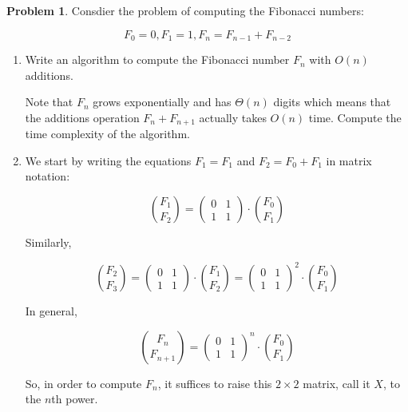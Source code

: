 \documentclass{article}
\theoremstyle{definition}
\newtheorem{problem}{Problem}
\def\fline{\rule{0.75\linewidth}{0.5pt}}
\newcommand{\finishline}{\begin{center}\fline\end{center}}
\newtheorem*{solution*}{Solution}
\newenvironment{solution}{\begin{solution*}}{{\finishline} \end{solution*}}
\begin{document}

\smallskip

\begin{problem} Consdier the problem of computing the Fibonacci numbers:

$$
F_0=0, F_1=1, F_n=F_{n-1}+F_{n-2}
$$


    \begin{enumerate}[label =\alph *)]
        \item Write an algorithm to compute the Fibonacci number $F_n$ with $O(n)$ additions.

Note that $F_n$ grows exponentially and has $\Theta(n)$ digits which means that the additions operation $F_n + F_{n+1}$ actually takes $O(n)$ time. Compute the time complexity of the algorithm.

\item We start by writing the equations $F_1=F_1$ and $F_2=F_0+F_1$ in matrix notation:

$$
\binom{F_1}{F_2}=\left(\begin{array}{ll}
0 & 1 \\
1 & 1
\end{array}\right) \cdot\binom{F_0}{F_1}
$$


Similarly,

$$
\binom{F_2}{F_3}=\left(\begin{array}{ll}
0 & 1 \\
1 & 1
\end{array}\right) \cdot\binom{F_1}{F_2}=\left(\begin{array}{ll}
0 & 1 \\
1 & 1
\end{array}\right)^2 \cdot\binom{F_0}{F_1}
$$

In general,

$$
\binom{F_n}{F_{n+1}}=\left(\begin{array}{ll}
0 & 1 \\
1 & 1
\end{array}\right)^n \cdot\binom{F_0}{F_1}
$$


So, in order to compute $F_n$, it suffices to raise this $2 \times 2$ matrix, call it $X$, to the $n$th power.


\end{enumerate}
\end{problem}
\end{document}
